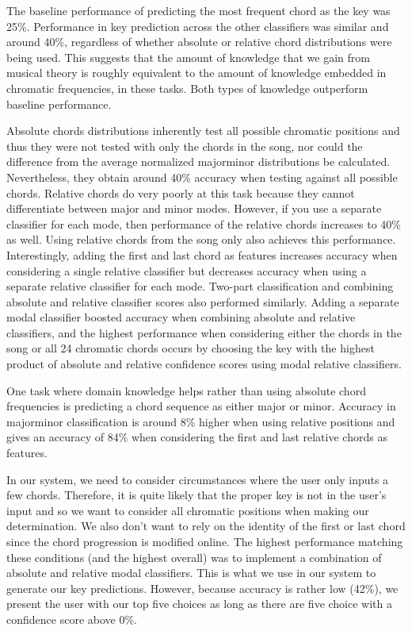 \documentclass[letterpaper]{article}
\begin{document}
The baseline performance of predicting the most frequent chord as the key was 25\%.  Performance in key prediction across the other classifiers was similar and around 40\%, regardless of whether absolute or relative chord distributions were being used.  This suggests that the amount of knowledge that we gain from musical theory is roughly equivalent to the amount of knowledge embedded in chromatic frequencies, in these tasks.  Both types of knowledge outperform baseline performance.

Absolute chords distributions inherently test all possible chromatic positions and thus they were not tested with only the chords in the song, nor could the difference from the average normalized major\/minor distributions be calculated.  Nevertheless, they obtain around 40\% accuracy when testing against all possible chords.  Relative chords do very poorly at this task because they cannot differentiate between major and minor modes.  However, if you use a separate classifier for each mode, then performance of the relative chords increases to 40\% as well.  Using relative chords from the song only also achieves this performance.  Interestingly, adding the first and last chord as features increases accuracy when considering a single relative classifier but decreases accuracy when using a separate relative classifier for each mode.  Two-part classification and combining absolute and relative classifier scores also performed similarly.  Adding a separate modal classifier boosted accuracy when combining absolute and relative classifiers, and the highest performance when considering either the chords in the song or all 24 chromatic chords occurs by choosing the key with the highest product of absolute and relative confidence scores using modal relative classifiers.

One task where domain knowledge helps rather than using absolute chord frequencies is predicting a chord sequence as either major or minor.  Accuracy in major\/minor classification is around 8\% higher when using relative positions and gives an accuracy of 84\% when considering the first and last relative chords as features.

In our system, we need to consider circumstances where the user only inputs a few chords.  Therefore, it is quite likely that the proper key is not in the user's input and so we want to consider all chromatic positions when making our determination.  We also don't want to rely on the identity of the first or last chord since the chord progression is modified online.  The highest performance matching these conditions (and the highest overall) was to implement a combination of absolute and relative modal classifiers.  This is what we use in our system to generate our key predictions.  However, because accuracy is rather low (42\%), we present the user with our top five choices as long as there are five choice with a confidence score above 0\%.
\end{document}
